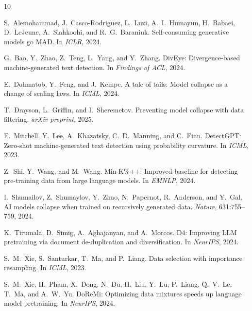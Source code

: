 \documentclass[11pt,a4paper]{article}
\begin{document}
\begin{thebibliography}{10}

S.~Alemohammad, J.~Casco-Rodriguez, L.~Luzi, A.~I.~Humayun, H.~Babaei, D.~LeJeune, A.~Siahkoohi, and R.~G.~Baraniuk.
\newblock Self-consuming generative models go MAD.
\newblock In \emph{ICLR}, 2024.

G.~Bao, Y.~Zhao, Z.~Teng, L.~Yang, and Y.~Zhang.
\newblock DivEye: Divergence-based machine-generated text detection.
\newblock In \emph{Findings of ACL}, 2024.

E.~Dohmatob, Y.~Feng, and J.~Kempe.
\newblock A tale of tails: Model collapse as a change of scaling laws.
\newblock In \emph{ICML}, 2024.

T.~Drayson, L.~Griffin, and I.~Sheremetov.
\newblock Preventing model collapse with data filtering.
\newblock \emph{arXiv preprint}, 2025.

E.~Mitchell, Y.~Lee, A.~Khazatsky, C.~D.~Manning, and C.~Finn.
\newblock DetectGPT: Zero-shot machine-generated text detection using probability curvature.
\newblock In \emph{ICML}, 2023.

Z.~Shi, Y.~Wang, and M.~Wang.
\newblock Min-K\%++: Improved baseline for detecting pre-training data from large language models.
\newblock In \emph{EMNLP}, 2024.

I.~Shumailov, Z.~Shumaylov, Y.~Zhao, N.~Papernot, R.~Anderson, and Y.~Gal.
\newblock AI models collapse when trained on recursively generated data.
\newblock \emph{Nature}, 631:755--759, 2024.

K.~Tirumala, D.~Simig, A.~Aghajanyan, and A.~Morcos.
\newblock D4: Improving LLM pretraining via document de-duplication and diversification.
\newblock In \emph{NeurIPS}, 2024.

S.~M.~Xie, S.~Santurkar, T.~Ma, and P.~Liang.
\newblock Data selection with importance resampling.
\newblock In \emph{ICML}, 2023.

S.~M.~Xie, H.~Pham, X.~Dong, N.~Du, H.~Liu, Y.~Lu, P.~Liang, Q.~V.~Le, T.~Ma, and A.~W.~Yu.
\newblock DoReMi: Optimizing data mixtures speeds up language model pretraining.
\newblock In \emph{NeurIPS}, 2024.

\end{thebibliography}
\end{document}
